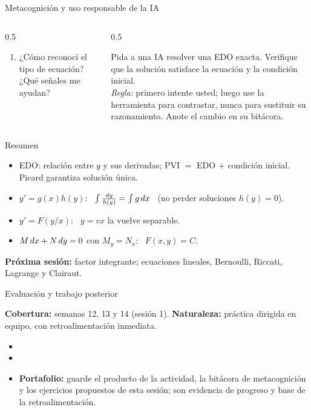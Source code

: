 \documentclass[10pt,aspectratio=169]{beamer}
\begin{document}
\begin{frame}{Metacognición y uso responsable de la IA}
  \small
  \begin{columns}[t]
    \begin{column}{0.5\textwidth}
      \begin{metacog}
        \begin{enumerate}
          \metacomun
          \item ¿Cómo reconocí el tipo de ecuación? ¿Qué señales me ayudan?
        \end{enumerate}
      \end{metacog}
    \end{column}
    \begin{column}{0.5\textwidth}
      \begin{iabox}
        Pida a una IA resolver una EDO exacta. Verifique que la solución satisface la ecuación y la condición inicial.\\[2pt]
        \textit{Regla:} primero intente usted; luego use la herramienta para contrastar, nunca para sustituir su razonamiento. Anote el cambio en su bitácora.
      \end{iabox}
    \end{column}
  \end{columns}
\end{frame}

\begin{frame}{Resumen}
  \begin{itemize}
    \item EDO: relación entre $y$ y sus derivadas; PVI $=$ EDO $+$ condición inicial. Picard garantiza solución única.
    \item {} $y'=g(x)h(y)$: \ $\int\frac{dy}{h(y)}=\int g\,dx$ \ (no perder soluciones $h(y)=0$).
    \item {} $y'=F(y/x)$: \ $y=vx$ la vuelve separable.
    \item {} $M\,dx+N\,dy=0$ con $M_y=N_x$: \ $F(x,y)=C$.
  \end{itemize}
  \vspace{3mm}
  \textbf{Próxima sesión:} factor integrante; ecuaciones lineales, Bernoulli, Riccati, Lagrange y Clairaut.
\end{frame}


\begin{frame}{Evaluación y trabajo posterior}
  \small
  \begin{evalbox}
    \textbf{Cobertura:} semanas 12, 13 y 14 (sesión 1). \textbf{Naturaleza:} práctica dirigida en equipo, con retroalimentación inmediata.
  \end{evalbox}
  \begin{itemize}
    \item \criterios
    \item \declaracionia
    \item \textbf{Portafolio:} guarde el producto de la actividad, la bitácora de metacognición y los ejercicios propuestos de esta sesión; son evidencia de progreso y base de la retroalimentación.
  \end{itemize}
\end{frame}
\end{document}
